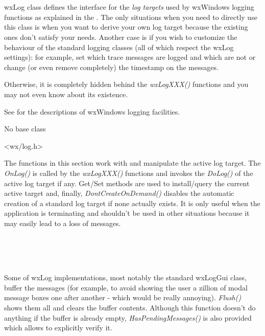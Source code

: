 \section{}\label{wxlog}

wxLog class defines the interface for the {\it log targets} used by wxWindows
logging functions as explained in the .
The only situations when you need to directly use this class is when you want
to derive your own log target because the existing ones don't satisfy your
needs. Another case is if you wish to customize the behaviour of the standard
logging classes (all of which respect the wxLog settings): for example, set
which trace messages are logged and which are not or change (or even remove
completely) the timestamp on the messages.

Otherwise, it is completely hidden behind the {\it wxLogXXX()} functions and
you may not even know about its existence.

See  for the descriptions of wxWindows
logging facilities.


No base class


<wx/log.h>



The functions in this section work with and manipulate the active log target.
The {\it OnLog()} is called by the {\it wxLogXXX()} functions and invokes the 
{\it DoLog()} of the active log target if any. Get/Set methods are used to
install/query the current active target and, finally, {\it
DontCreateOnDemand()} disables the automatic creation of a standard log target
if none actually exists. It is only useful when the application is terminating
and shouldn't be used in other situations because it may easily lead to a loss
of messages.

\\
\\
\\


Some of wxLog implementations, most notably the standard
wxLogGui class, buffer the messages (for example, to avoid
showing the user a zillion of modal message boxes one after another - which
would be really annoying). {\it Flush()} shows them all and clears the buffer
contents. Although this function doesn't do anything if the buffer is already
empty, {\it HasPendingMessages()} is also provided which allows to explicitly
verify it.

